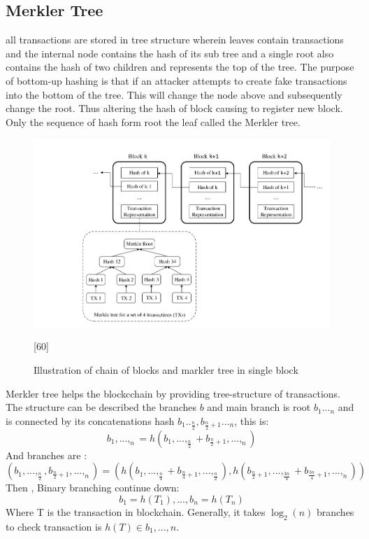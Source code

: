\subsection{Merkler Tree}
all transactions are stored in tree structure wherein leaves contain transactions and the internal node contains the hash of its sub tree and a single root also contains the hash of two children and represents the top of the tree. The purpose of bottom-up hashing is that if an attacker attempts to create fake transactions into the bottom of the tree. This will change the node above and subsequently change the root. Thus altering the hash of block causing to register new block. Only the sequence of hash form root the leaf called the Merkler tree\cite{Vitalik}.   
\begin{center}
	\begin{figure}[htb!]
		
		\begin{minipage}{0.55\linewidth}
			\centering
			\includegraphics[width=1.85\textwidth]{images/chap01_Markler_tree.png}
		\end{minipage}
		\caption{Illustration of chain of blocks and  markler tree in single block}{[60]}
		
		
	\end{figure}
	
\end{center}
Merkler tree helps the blockcchain by providing tree-structure of transactions. The structure can be described the branches $b$ and main branch is root $b_1..._n$ and is connected by its concatenations hash $b_1.._{\frac{n}{2}}, b_{\frac{n}{2}+1}..._n$, this is:\\
\[b_1,...,_n=h(b_1,...,_{\frac{n}{2}}+ b_{\frac{n}{2}+1},...,_n) \]
And branches are :
\[ (b_1,...,_{\frac{n}{2}}, b_{\frac{n}{2}+1},...,_n)=(h(b_1,...,_{\frac{n}{4}}+ b_{\frac{n}{4}+1},...,_\frac{n}{2}) , h(b_{\frac{n}{2}+1},...,_{\frac{3n}{4}}+ b_{\frac{3n}{4}+1},...,_n))\]
Then , Binary branching continue down:
\[ b_1=h(T_1),...,b_n=h(T_n)   \]
Where T is the transaction in blockchain. Generally, it takes $\log_2(n)$ branches to check transaction is $h(T)\in b_1,...,n$\cite{Kevin}.

